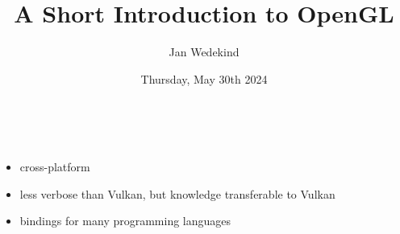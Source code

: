 \documentclass[calcdimensions,landscape,letterpaper]{powersem}
\title{A Short Introduction to OpenGL}
\author{Jan Wedekind}
\date{Thursday, May 30th 2024}
\newcommand{\thecurrentheading}{}
\newcommand{\heading}[1]{\renewcommand{\thecurrentheading}{#1}}
\begin{document}
\begin{slide}
  \heading{\ }
  \begin{center}
    \maketitle
  \end{center}
\end{slide}

\begin{slide}
  \heading{Motivation}
  \begin{center}
    \bigskip\\
    \begin{minipage}[c]{\textwidth}
      \begin{itemize}
          \item cross-platform
          \item less verbose than Vulkan, but knowledge transferable to Vulkan
          \item bindings for many programming languages
      \end{itemize}
    \end{minipage}
  \end{center}
\end{slide}
\end{document}
